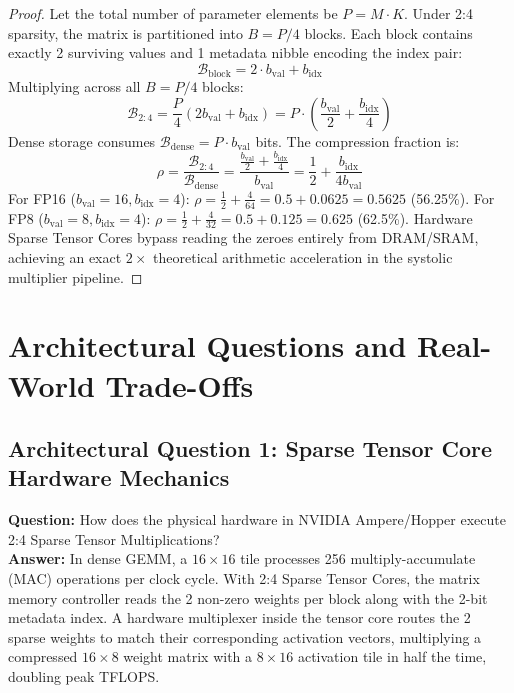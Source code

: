 \documentclass[11pt,a4paper]{article}
\theoremstyle{definition}
\begin{document}
\begin{proof}
Let the total number of parameter elements be $P = M \cdot K$.
Under 2:4 sparsity, the matrix is partitioned into $B = P / 4$ blocks.
Each block contains exactly 2 surviving values and 1 metadata nibble encoding the index pair:
\begin{equation}
\mathcal{B}_{\text{block}} = 2 \cdot b_{\text{val}} + b_{\text{idx}}
\end{equation}
Multiplying across all $B = P / 4$ blocks:
\begin{equation}
\mathcal{B}_{2:4} = \frac{P}{4} \left( 2 b_{\text{val}} + b_{\text{idx}} \right) = P \cdot \left( \frac{b_{\text{val}}}{2} + \frac{b_{\text{idx}}}{4} \right)
\end{equation}
Dense storage consumes $\mathcal{B}_{\text{dense}} = P \cdot b_{\text{val}}$ bits.
The compression fraction is:
\begin{equation}
\rho = \frac{\mathcal{B}_{2:4}}{\mathcal{B}_{\text{dense}}} = \frac{\frac{b_{\text{val}}}{2} + \frac{b_{\text{idx}}}{4}}{b_{\text{val}}} = \frac{1}{2} + \frac{b_{\text{idx}}}{4 b_{\text{val}}}
\end{equation}
For FP16 ($b_{\text{val}}=16, b_{\text{idx}}=4$): $\rho = \frac{1}{2} + \frac{4}{64} = 0.5 + 0.0625 = 0.5625$ (56.25\%).
For FP8 ($b_{\text{val}}=8, b_{\text{idx}}=4$): $\rho = \frac{1}{2} + \frac{4}{32} = 0.5 + 0.125 = 0.625$ (62.5\%).
Hardware Sparse Tensor Cores bypass reading the zeroes entirely from DRAM/SRAM, achieving an exact $2\times$ theoretical arithmetic acceleration in the systolic multiplier pipeline.
\end{proof}

\section{Architectural Questions and Real-World Trade-Offs}

\subsection{Architectural Question 1: Sparse Tensor Core Hardware Mechanics}
\textbf{Question:} How does the physical hardware in NVIDIA Ampere/Hopper execute 2:4 Sparse Tensor Multiplications?\\
\textbf{Answer:} In dense GEMM, a $16 \times 16$ tile processes 256 multiply-accumulate (MAC) operations per clock cycle. With 2:4 Sparse Tensor Cores, the matrix memory controller reads the 2 non-zero weights per block along with the 2-bit metadata index. A hardware multiplexer inside the tensor core routes the 2 sparse weights to match their corresponding activation vectors, multiplying a compressed $16 \times 8$ weight matrix with a $8 \times 16$ activation tile in half the time, doubling peak TFLOPS.
\end{document}
